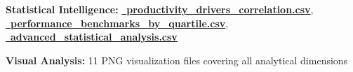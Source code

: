 \documentclass[12pt,a4paper]{article}
\begin{document}
\textbf{Statistical Intelligence:} \textcolor{successGreen}{\href{https://fixysaskihumorizijuv.supabase.co/storage/v1/object/public/research-files/dd2c8aa8-1c3d-4592-8ce2-9e275d102803-productivity_drivers_correlation.csv?download=}{{\normalsize\faCogs}\, \textbf{productivity\_drivers\_correlation.csv}}}, \\
\textcolor{primaryGold}{\href{https://fixysaskihumorizijuv.supabase.co/storage/v1/object/public/research-files/e3bd4059-8cc7-437f-8aab-a2ed0700120e-performance_benchmarks_by_quartile.csv?download=}{{\normalsize\faChartArea}\, \textbf{performance\_benchmarks\_by\_quartile.csv}}}, \\
\textcolor{accentBlue}{\href{https://fixysaskihumorizijuv.supabase.co/storage/v1/object/public/research-files/6bc2ed7c-9918-4171-9b19-2d31fb67df5d-advanced_statistical_analysis.csv?download=}{{\normalsize\faChartLine}\, \textbf{advanced\_statistical\_analysis.csv}}}

\textbf{Visual Analysis:} 11 PNG visualization files covering all analytical dimensions
\end{document}
